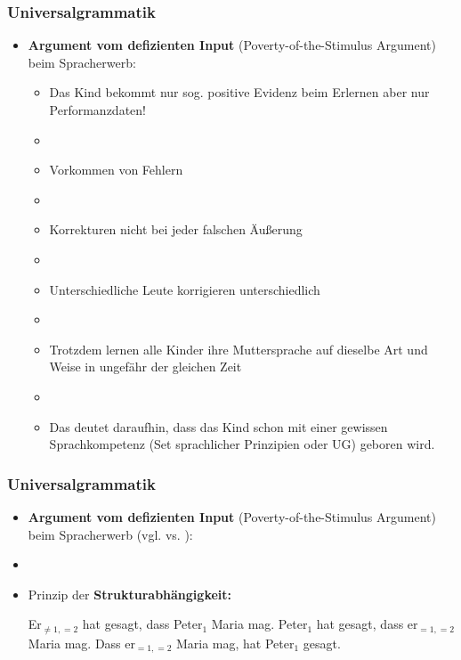 \begin{frame}
\frametitle{Universalgrammatik}

\begin{itemize}
	\item \textbf{Argument vom defizienten Input} (Poverty-of-the-Stimulus Argument) beim Spracherwerb:
	
	\begin{itemize}
		\item Das Kind bekommt nur sog. positive Evidenz beim Erlernen \ras aber nur Performanzdaten!
		\item[]
		\item Vorkommen von Fehlern
		\item[]
		\item Korrekturen \ras nicht bei jeder falschen Äußerung
		\item[]
		\item Unterschiedliche Leute korrigieren unterschiedlich
		\item[]
		\item Trotzdem lernen alle Kinder ihre Muttersprache auf dieselbe Art und Weise in ungefähr der gleichen Zeit \citep[vgl.][18ff.]{Philippi&Tewes10a}
		\item[]
		\item Das deutet daraufhin, dass das Kind schon mit einer gewissen Sprachkompetenz (Set sprachlicher Prinzipien oder UG) geboren wird.

	\end{itemize}

\end{itemize}

\end{frame}


\begin{frame}
\frametitle{Universalgrammatik}

\begin{itemize}
	\item \textbf{Argument vom defizienten Input} (Poverty-of-the-Stimulus Argument) beim Spracherwerb (vgl. \citet{Lasnik&Co02a} vs. \citet{Pullum&Scholz02a}):
	\item[]
	\item Prinzip der \textbf{Strukturabhängigkeit:}
	\eal 
\pause
\pause
\pause	
\pause
	\zl

\pause	

	\eal 
	\ex \alert{Er}$_{\neq 1, =2}$ hat gesagt, dass \alert{Peter}$_1$ Maria mag.
\pause	
	\ex \alert{Peter}$_1$ hat gesagt, dass \alert{er}$_{=1, =2}$ Maria mag.
\pause	
	\ex Dass \alert{er}$_{=1, =2}$ Maria mag, hat \alert{Peter}$_1$ gesagt.
	\zl
	
	
\end{itemize}

\end{frame}


